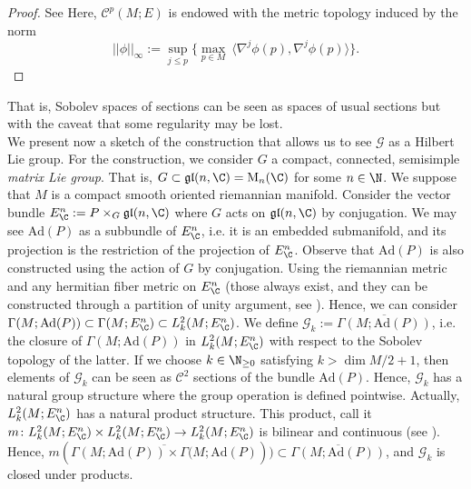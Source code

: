 \begin{proof}
    See \parencite[Th. B.2]{wehrheim2004uhlenbeck} Here, \(\mathscr{C}^p(M;E)\) is endowed with the metric topology induced by the norm 
    \[
    ||\phi||_\infty:=\sup_{j \leq p} \big\{ \max_{p \in M}\ \langle \nabla^j \phi(p), \nabla^j \phi(p)\rangle \big\}. 
    \]
\end{proof}
That is, Sobolev spaces of sections can be seen as spaces of usual sections but with the caveat that some regularity may be lost. \\

We present now a sketch of the construction that allows us to see \(\mathscr{G}\) as a Hilbert Lie group. For the construction, we consider \(G\) a compact, connected, semisimple \textit{matrix Lie group}. That is, \(G \subset \mathfrak{gl}(n,\C)=\mathrm{M}_n(\C)\) for some \(n\in \N\). We suppose that \(M\) is a compact smooth oriented riemannian manifold. Consider the vector bundle \(E^n_\C:=P \times_G \mathfrak{gl}(n, \C)\) where \(G\) acts on \(\mathfrak{gl}(n, \C)\) by conjugation. We may see \(\mathrm{Ad}(P)\) as a subbundle of \(E^n_\C\), i.e. it is an embedded submanifold, and its projection is the restriction of the projection of \(E_\C^n\). Observe that \(\mathrm{Ad}(P)\) is also constructed using the action of \(G\) by conjugation. Using the riemannian metric and any hermitian fiber metric on \(E_\C^n\) (those always exist, and they can be constructed through a partition of unity argument, see \parencite[Page 196]{lee_introCM}). Hence, we can consider \(\Gamma(M; \mathrm{Ad}(P))\subset \Gamma(M; E^n_\C)\subset L_k^2(M; E_\C^n)\). We define \(\mathscr{G}_k:=\overline{\Gamma(M;\mathrm{Ad}(P))}\), i.e. the closure of \(\Gamma(M;\mathrm{Ad}(P))\) in \(L_k^2(M;E_\C^n)\) with respect to the Sobolev topology of the latter. If we choose \(k \in \N_{\geq 0}\) satisfying \(k>\dim M/2+1\), then elements of \(\mathscr{G}_k\) can be seen as \(\mathscr{C}^2\) sections of the bundle \(\mathrm{Ad}(P)\). Hence, \(\mathscr{G}_k\) has a natural group structure where the group operation is defined pointwise. Actually, \(L_k^2(M; E_\C^n)\) has a natural product structure. This product, call it \(m\colon L_k^2(M; E_\C^n) \times L_k^2(M; E_\C^n) \to L_k^2(M; E_\C^n) \) is bilinear and continuous (see \parencite[Eq. 2.2]{mitter1981bundle}). Hence, \(m(\overline{\Gamma(M; \mathrm{Ad}(P))\times \Gamma(M; \mathrm{Ad}(P)}))\subset \overline{\Gamma(M; \mathrm{Ad}(P))}\), and \(\mathscr{G}_k\) is closed under products. 



